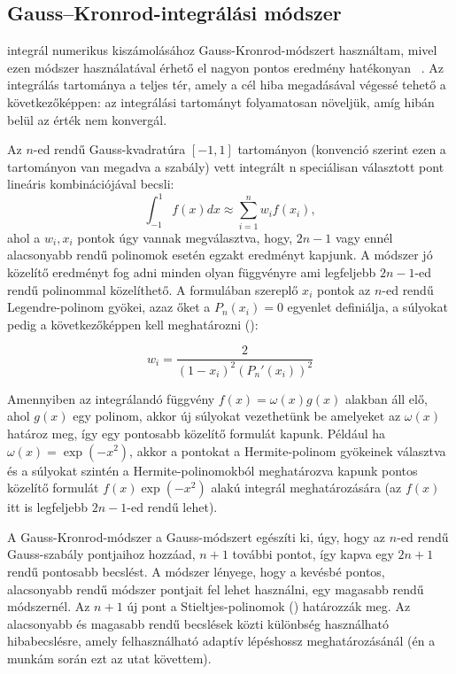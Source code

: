 \documentclass[11pt,a4paper]{article}
\numberwithin{equation}{subsection}
\numberwithin{figure}{section}
\begin{document}
\subsection{Gauss–Kronrod-integrálási módszer}\label{sec:GK}

 integrál numerikus kiszámolásához Gauss-Kronrod-módszert használtam, mivel ezen módszer használatával érhető el nagyon pontos eredmény hatékonyan  ~\cite{LevyEff}. Az integrálás tartománya a teljes tér, amely a cél hiba megadásával végessé tehető a következőképpen: az integrálási tartományt folyamatosan növeljük, amíg hibán belül az érték nem konvergál. 

Az $n$-ed rendű Gauss-kvadratúra $[-1,1]$ tartományon (konvenció szerint ezen a tartományon van megadva a szabály) vett integrált n speciálisan választott pont lineáris kombinációjával becsli:
\begin{equation}
\int_{-1}^1 f(x)dx\approx \sum_{i=1}^n w_if(x_i),
\end{equation}
ahol a $w_i, x_i$ pontok úgy vannak megválasztva, hogy, $2n-1$ vagy ennél alacsonyabb rendű polinomok esetén egzakt eredményt kapjunk. A módszer jó közelítő eredményt fog adni minden olyan függvényre ami legfeljebb $2n-1$-ed rendű polinommal közelíthető. A formulában szereplő $x_i$ pontok az $n$-ed rendű Legendre-polinom gyökei, azaz őket a $P_n(x_i)=0$ egyenlet definiálja, a súlyokat pedig a következőképpen kell meghatározni (\cite{LGQ}):

\begin{equation}
w_i=\frac{2}{(1-x_i)^2(P_n'(x_i))^2}
\end{equation}

Amennyiben az integrálandó függvény $f(x)=\omega(x)g(x)$ alakban áll elő, ahol $g(x)$ egy polinom, akkor új súlyokat vezethetünk be amelyeket az $\omega(x)$ határoz meg, így egy pontosabb közelítő formulát kapunk. Például ha $\omega(x)=\exp(-x^2)$, akkor a pontokat a Hermite-polinom gyökeinek választva és a súlyokat szintén a Hermite-polinomokból meghatározva kapunk pontos közelítő formulát $f(x)\exp(-x^2)$ alakú integrál meghatározására (az $f(x)$ itt is legfeljebb $2n-1$-ed rendű lehet).

A Gauss-Kronrod-módszer a Gauss-módszert egészíti ki, úgy, hogy az $n$-ed rendű Gauss-szabály pontjaihoz hozzáad, $n+1$ további pontot, így kapva egy $2n+1$ rendű pontosabb becslést. A módszer lényege, hogy a kevésbé pontos, alacsonyabb rendű módszer pontjait fel lehet használni, egy magasabb rendű módszernél. Az $n+1$ új pont a Stieltjes-polinomok (\cite{NIST:DLMF}) határozzák meg. Az alacsonyabb és magasabb rendű becslések közti különbség használható hibabecslésre, amely felhasználható adaptív lépéshossz meghatározásánál (én a munkám során ezt az utat követtem). 
\end{document}
